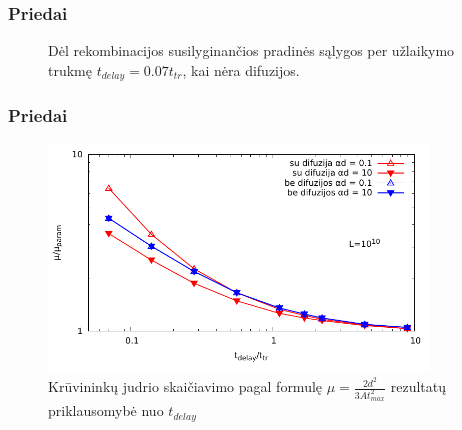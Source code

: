 \documentclass{beamer}
\begin{document}
\begin{frame}
\frametitle{Priedai}
\begin{figure}
  \centering
  \caption{Dėl rekombinacijos susilyginančios pradinės sąlygos per užlaikymo trukmę $t_{delay} = 0.07t_{tr}$, kai nėra difuzijos.}
\end{figure}
\end{frame}

\begin{frame}
\frametitle{Priedai}
\begin{figure}
  \centering
	\includegraphics[width=0.9\textwidth]{./media/pdf/log_mobility.pdf}
  \caption{Krūvininkų judrio skaičiavimo pagal formulę $\mu = \frac{2d^2}{3At_{max}^2}$ rezultatų priklausomybė nuo $t_{delay}$}
\end{figure}
\end{frame}
\end{document}
